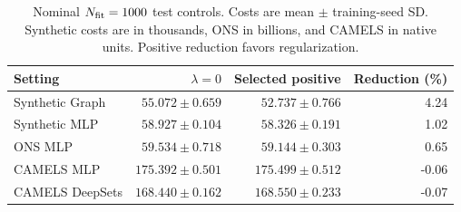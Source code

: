 \begin{table}[ht]
\caption{Nominal $N_{\rm fit}=1000$ test controls. Costs are mean $\pm$
training-seed SD. Synthetic costs are in thousands, ONS in billions, and
CAMELS in native units. Positive reduction favors regularization.}
\label{tab:regularization-nominal}
\centering\scriptsize
\setlength{\tabcolsep}{3pt}
\begin{tabular}{@{}lrrr@{}}
\toprule
Setting & $\lambda=0$ & Selected positive & Reduction (\%)\\
\midrule
Synthetic Graph & $55.072\pm0.659$ & $52.737\pm0.766$ & 4.24\\
Synthetic MLP & $58.927\pm0.104$ & $58.326\pm0.191$ & 1.02\\
ONS MLP & $59.534\pm0.718$ & $59.144\pm0.303$ & 0.65\\
CAMELS MLP & $175.392\pm0.501$ & $175.499\pm0.512$ & -0.06\\
CAMELS DeepSets & $168.440\pm0.162$ & $168.550\pm0.233$ & -0.07\\
\bottomrule
\end{tabular}
\end{table}
